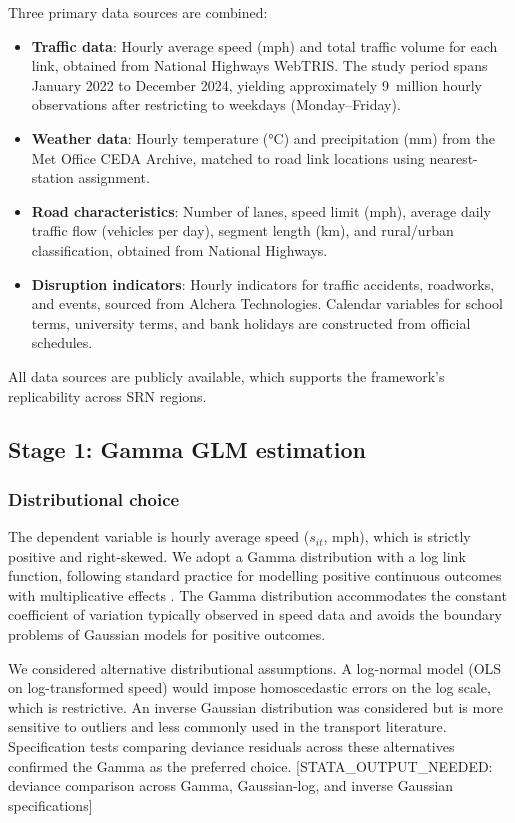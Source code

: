 \documentclass[review]{elsarticle}
\begin{document}
Three primary data sources are combined:

\begin{itemize}
    \item \textbf{Traffic data}: Hourly average speed (mph) and total traffic volume for each link, obtained from National Highways WebTRIS. The study period spans January 2022 to December 2024, yielding approximately 9~million hourly observations after restricting to weekdays (Monday--Friday).
    \item \textbf{Weather data}: Hourly temperature (\si{\degreeCelsius}) and precipitation (\si{mm}) from the Met Office CEDA Archive, matched to road link locations using nearest-station assignment.
    \item \textbf{Road characteristics}: Number of lanes, speed limit (\si{mph}), average daily traffic flow (vehicles per day), segment length (\si{km}), and rural/urban classification, obtained from National Highways.
    \item \textbf{Disruption indicators}: Hourly indicators for traffic accidents, roadworks, and events, sourced from Alchera Technologies. Calendar variables for school terms, university terms, and bank holidays are constructed from official schedules.
\end{itemize}

All data sources are publicly available, which supports the framework's replicability across SRN regions.


\subsection{Stage 1: Gamma GLM estimation}
\label{sec:method:glm}

\subsubsection{Distributional choice}

The dependent variable is hourly average speed ($s_{it}$, mph), which is strictly positive and right-skewed. We adopt a Gamma distribution with a log link function, following standard practice for modelling positive continuous outcomes with multiplicative effects \citep{mccullagh1989glm,nelder1972glm}. The Gamma distribution accommodates the constant coefficient of variation typically observed in speed data and avoids the boundary problems of Gaussian models for positive outcomes.

We considered alternative distributional assumptions. A log-normal model (OLS on log-transformed speed) would impose homoscedastic errors on the log scale, which is restrictive. An inverse Gaussian distribution was considered but is more sensitive to outliers and less commonly used in the transport literature. Specification tests comparing deviance residuals across these alternatives confirmed the Gamma as the preferred choice. [STATA\_OUTPUT\_NEEDED: deviance comparison across Gamma, Gaussian-log, and inverse Gaussian specifications]
\end{document}
